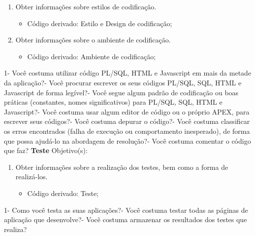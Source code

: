\begin{anexosenv}
\begin{enumerate}
\item Obter informações sobre estilos de codificação.
\begin{itemize}
\item Código derivado: Estilo e Design de codificação;
\end{itemize}
\item Obter informações sobre o ambiente de codificação.
\begin{itemize}
\item Código derivado: Ambiente de codificação;
\end{itemize}
\end{enumerate}
    1- Você costuma utilizar código PL/SQL, HTML e Javascript em mais da metade da aplicação?- Você procurar escrever os seus códigos PL/SQL, SQL, HTML e Javascript de forma legível?- Você segue algum padrão de codificação ou boas práticas (constantes, nomes significativos) para PL/SQL, SQL, HTML e Javascript?- Você costuma usar algum editor de código ou o próprio APEX, para escrever seus códigos?- Você costuma depurar o código?- Você costuma classificar os erros encontrados (falha de execução ou comportamento inesperado), de forma que possa ajudá-lo na abordagem de resolução?- Você costuma comentar o código que faz?\newline
\newline\newline
\textbf{Teste}\newline\newline
Objetivo(s):
\begin{enumerate}
\item Obter informações sobre a realização dos testes, bem como a forma de realizá-los.
\begin{itemize}
\item Código derivado: Teste;
\end{itemize}
\end{enumerate}
    1- Como você testa as suas aplicações?- Você costuma testar todas as páginas de aplicação que desenvolve?- Você costuma armazenar os resultados dos testes que realiza?\newline

\end{anexosenv}
